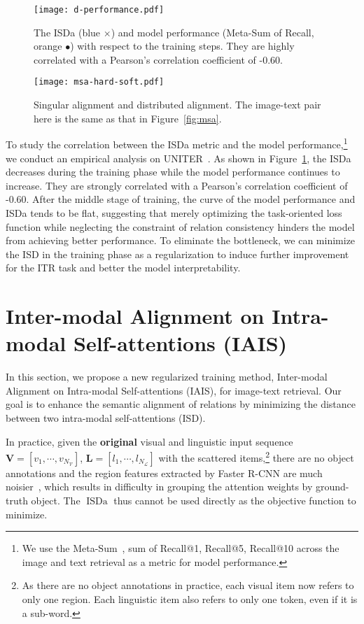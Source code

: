 \documentclass[11pt,a4paper]{article}
\begin{document}
%
 
\begin{figure}[t]
    \centering
    \texttt{[image: d-performance.pdf]}
    \caption{The ISDa (blue $\times$) and model performance (Meta-Sum of Recall, orange $\bullet$) with respect to the training steps. They are highly correlated with a Pearson's correlation coefficient of -0.60.}
    \label{fig:msd-performance}
\end{figure}


\begin{figure*}[t!]
    \centering
    \texttt{[image: msa-hard-soft.pdf]}
    \caption{Singular alignment and distributed alignment. The image-text pair here is the same as that in Figure~\ref{fig:msa}.}
    \label{fig:msa-hard-soft}
\end{figure*}

To study the correlation between the ISDa metric and the model performance,\footnote{We use the Meta-Sum~\cite{UNITER}, sum of Recall@1, Recall@5, Recall@10 across the image and text retrieval as a metric for model performance.} we conduct an empirical analysis on UNITER~\cite{UNITER}. 
As shown in Figure~\ref{fig:msd-performance}, the ISDa decreases during the training phase while the model performance continues to increase. 
They are strongly correlated with a Pearson's correlation coefficient of -0.60.
After the middle stage of training, the curve of the model performance and ISDa tends to be flat, suggesting that merely optimizing the task-oriented loss function while neglecting the constraint of relation consistency hinders the model from achieving better performance. To eliminate the bottleneck, we can minimize the ISD in the training phase as a regularization to induce further improvement for the ITR task and better the model interpretability.

\section{Inter-modal Alignment on Intra-modal Self-attentions (IAIS)}
In this section, we propose a new regularized training method, Inter-modal Alignment on Intra-modal Self-attentions (IAIS), for image-text retrieval. 
Our goal is to enhance the semantic alignment of relations by minimizing the distance between two intra-modal self-attentions (ISD). 

In practice, given the \textbf{original} visual and linguistic input sequence $\mathbf{V}=[v_1, \cdots, v_{N_\mathcal{V}}]$, $\mathbf{L}=[l_1, \cdots, l_{N_\mathcal{L}}]$ with the scattered items,\footnote{As there are no object annotations in practice, each visual item now refers to only one region. 
Each linguistic item also refers to only one token, even if it is a sub-word.} there are no object annotations and the region features extracted by Faster R-CNN are much noisier~\cite{Oscar, BUTD}, which results in difficulty in grouping the attention weights by ground-truth object. 
The $\operatorname{ISDa}$ thus cannot be used directly as the objective function to minimize. 
\end{document}
